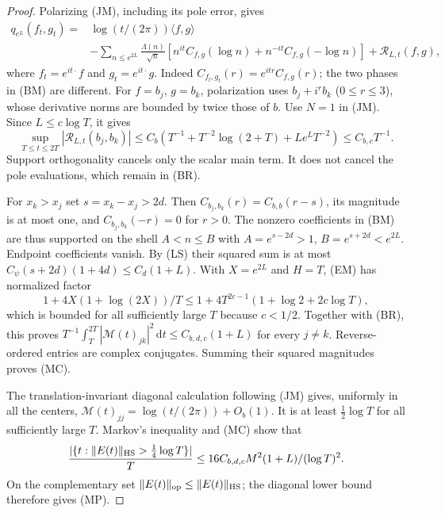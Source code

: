 \documentclass[11pt]{article}
\theoremstyle{remark}\newtheorem{remark}[theorem]{Remark}
\newcommand{\dd}{\,\mathrm d}
\begin{document}
\begin{proof}
Polarizing (JM), including its pole error, gives
\[
 \begin{split}
 q_{e^L}(f_t,g_t)={}&\log(t/(2\pi))\langle f,g\rangle\\
 &-\sum_{n\le e^{2L}}\frac{\Lambda(n)}{\sqrt n}
 \left[n^{it}C_{f,g}(\log n)+n^{-it}C_{f,g}(-\log n)\right]
 +\mathcal R_{L,t}(f,g),
 \end{split}                                         \tag{BM}
\]
where $f_t=e^{it\cdot}f$ and $g_t=e^{it\cdot}g$.
Indeed $C_{f_t,g_t}(r)=e^{itr}C_{f,g}(r)$; the two
phases in (BM) are different. For $f=b_j$, $g=b_k$,
polarization uses $b_j+i^r b_k$ ($0\le r\le3$), whose
derivative norms are bounded by twice those of $b$.
Use $N=1$ in (JM). Since $L\le c\log T$, it gives
\[
 \sup_{T\le t\le2T}|\mathcal R_{L,t}(b_j,b_k)|
 \le C_b\left(T^{-1}+T^{-2}\log(2+T)+Le^LT^{-2}\right)
 \le C_{b,c}T^{-1}.                                 \tag{BR}
\]
Support orthogonality cancels only the scalar main term.
It does not cancel the pole evaluations, which remain in (BR).

For $x_k>x_j$ set $s=x_k-x_j>2d$.
Then $C_{b_j,b_k}(r)=C_{b,b}(r-s)$, its magnitude is
at most one, and $C_{b_j,b_k}(-r)=0$ for $r>0$.
The nonzero coefficients in (BM) are thus supported on
the shell $A<n\le B$ with $A=e^{s-2d}>1$,
$B=e^{s+2d}<e^{2L}$. Endpoint coefficients vanish.
By (LS) their squared sum is at most
$C_\psi(s+2d)(1+4d)\le C_d(1+L)$.
With $X=e^{2L}$ and $H=T$, (EM) has normalized factor
\[
 1+4X(1+\log(2X))/T
 \le1+4T^{2c-1}(1+\log2+2c\log T),
\]
which is bounded for all sufficiently large $T$ because $c<1/2$.
Together with (BR), this proves
$T^{-1}\int_T^{2T}|\mathcal M(t)_{jk}|^2\dd t
\le C_{b,d,c}(1+L)$ for every $j\ne k$.
Reverse-ordered entries are complex conjugates.
Summing their squared magnitudes proves (MC).

The translation-invariant diagonal calculation following (JM)
gives, uniformly in all the centers,
$\mathcal M(t)_{jj}=\log(t/(2\pi))+O_b(1)$.
It is at least $\frac12\log T$ for all sufficiently large $T$.
Markov's inequality and (MC) show that
\[
 \frac{|\{t:\|E(t)\|_{\rm HS}>\tfrac14\log T\}|}{T}
 \le16C_{b,d,c}M^2(1+L)/(\log T)^2.
\]
On the complementary set $\|E(t)\|_{\rm op}\le\|E(t)\|_{\rm HS}$;
the diagonal lower bound therefore gives (MP).
\end{proof}
\end{document}
